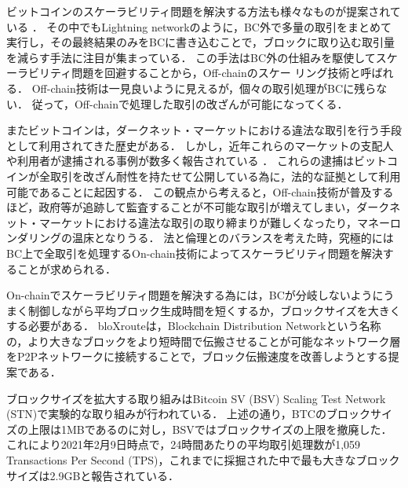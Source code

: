 \documentclass[graybox]{svmult}
\begin{document}
ビットコインのスケーラビリティ問題を解決する方法も様々なものが提案されている
\cite{ZHZB2020,Fujihara2018,Fujihara2019,Fujihara2020,YF2021a,YF2021b}．
その中でもLightning network\cite{PD2016}のように，BC外で多量の取引をまとめて実行し，その最終結果のみをBCに書き込むことで，ブロックに取り込む取引量を減らす手法に注目が集まっている．
この手法はBC外の仕組みを駆使してスケーラビリティ問題を回避することから，Off-chainのスケー
リング技術と呼ばれる．
Off-chain技術は一見良いように見えるが，個々の取引処理がBCに残らない．
従って，Off-chainで処理した取引の改ざんが可能になってくる．

またビットコインは，ダークネット・マーケットにおける違法な取引を行う手段として利用されてきた歴史がある．
しかし，近年これらのマーケットの支配人や利用者が逮捕される事例が数多く報告されている
\cite{silkroad,alphabay,welcome2video}．
これらの逮捕はビットコインが全取引を改ざん耐性を持たせて公開している為に，法的な証拠として利用可能であることに起因する．
この観点から考えると，Off-chain技術が普及するほど，政府等が追跡して監査することが不可能な取引が増えてしまい，ダークネット・マーケットにおける違法な取引の取り締まりが難しくなったり，マネーロンダリングの温床となりうる．
法と倫理とのバランスを考えた時，究極的にはBC上で全取引を処理するOn-chain技術によってスケーラビリティ問題を解決することが求められる．

On-chainでスケーラビリティ問題を解決する為には，BCが分岐しないようにうまく制御しながら平均ブロック生成時間を短くするか，ブロックサイズを大きくする必要がある．
bloXroute\cite{bloX}は，Blockchain Distribution Networkという名称の，より大きなブロックをより短時間で伝搬させることが可能なネットワーク層をP2Pネットワークに接続することで，ブロック伝搬速度を改善しようとする提案である．

ブロックサイズを拡大する取り組みはBitcoin SV (BSV) \cite{bsv} Scaling Test Network (STN)で実験的な取り組みが行われている\cite{bitcoinscaling}．
上述の通り，BTCのブロックサイズの上限は1MBであるのに対し，BSVではブロックサイズの上限を撤廃した．
これにより2021年2月9日時点で，24時間あたりの平均取引処理数が1,059 Transactions Per Second (TPS)，これまでに採掘された中で最も大きなブロックサイズは2.9GBと報告されている．
\end{document}
